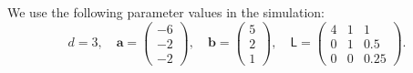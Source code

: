 \documentclass[twocolumn]{svjour3}          %
\newcommand{\bm}[1]{\boldsymbol{#1}}
\newcommand{\va}{\bm{a}}
\newcommand{\vb}{\bm{b}}
\newcommand{\mL}{\mathsf{L}}
\begin{document}
We use the following parameter values in the simulation: 
\begin{equation*}
d = 3, \quad \va = \begin{pmatrix}
-6 \\ -2 \\ -2
\end{pmatrix}, \quad 
\vb = \begin{pmatrix}
5 \\ 2 \\ 1
\end{pmatrix} , \quad 
\mL = \begin{pmatrix}
4 & 1 & 1 \\ 0 & 1 & 0.5 \\ 0 & 0 & 0.25
\end{pmatrix}.
\end{equation*}
\end{document}
